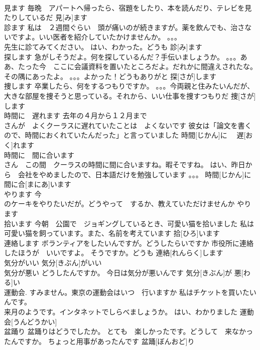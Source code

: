 \documentclass[8pt]{extreport}
\begin{document}
\begin{CJK}{UTF8}{min}
\\	見ます	毎晩　アパートへ帰ったら、宿題をしたり、本を読んだり、テレビを見たりしているだ	見[み]ます					
\\	診ます	私は　２週間ぐらい　頭が痛いのが続きますが。薬を飲んでも、治さないですよ。いい医者を紹介していたかけませんか。 。。。
\\	先生に診てみてください。 はい、わかった。どうも	診[み]ます					
\\	探します	急がしそうだよ。何を探しているんだ？手伝いましょうか。 。。。ああ、たった今　ここに会議資料を置いたところだよ。だれかに間違えされたな。 その隅にあったよ。 。。。よかった！どうもありがと	探[さが]します					
\\	捜します	卒業したら、何をするつもりですか。 。。。今両親と住みたいんだが、大きな部屋を捜そうと思っている。それから、いい仕事を捜すつもりだ	捜[さが]します					
\\	時間に　遅れます	去年の４月から１２月まで　
\\	さんが　よくクーラスに遅れていたことは　よくないです 彼女は「論文を書くので、時間におくれていたんだった」と言っていました	時間[じかん]に　 遅[おく]れます					
\\	時間に　間に合います	
\\	さん　この間　クーラスの時間に間に合いますね。暇そですね。 はい、昨日から　会社をやめましたので、日本語だけを勉強しています 。。。	時間[じかん]に　 間に合[まにあ]います					
\\	やります	今
\\	のケーキをやりたいだが。どうやって　するか、教えていただけませんか	やります						
\\	拾います	今朝　公園で　ジョギングしているとき、可愛い猫を拾いました 私は可愛い猫を飼っています。また、名前を考えています	拾[ひろ]います					
\\	連絡します	ボランティアをしたいんですが。どうしたらいですか 市役所に連絡したほうが　いいですよ。 そうですか。どうも	連絡[れんらく]します					
\\	気分がいい		気分[きぶん]がいい					
\\	気分が悪い	どうしたんですか。 今日は気分が悪いんです	気分[きぶん]が 悪[わる]い					
\\	運動会.	すみません。東京の運動会はいつ　行いますか 私はチケットを買いたいんです。 
\\	来月のようです。インタネットでしらべましょうか。 はい、わかりました	運動会[うんどうかい]					
\\	盆踊り	盆踊りはどうでしたか。 とても　楽しかったです。どうして　来なかったんですか。 ちょっと用事があったんです	盆踊[ぼんおど]り					

\end{CJK}
\end{document}
